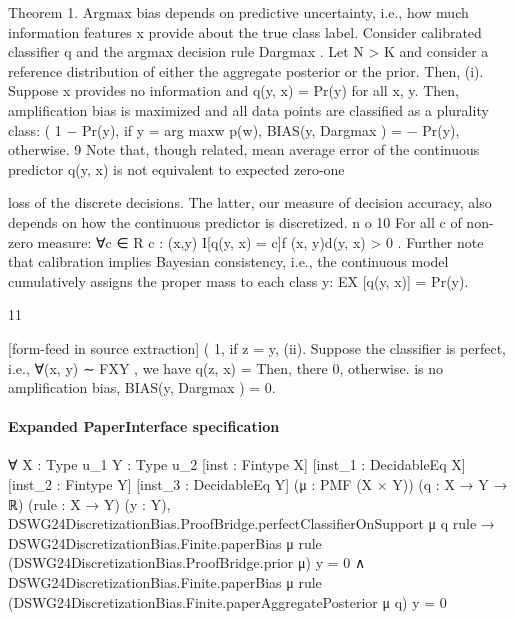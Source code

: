\documentclass[10pt]{article}
\begin{document}
\begin{ReviewVerbatim}

Theorem 1. Argmax bias depends on predictive uncertainty, i.e., how much information features x provide
about the true class label. Consider calibrated classifier q and the argmax decision rule Dargmax . Let N > K
and consider a reference distribution of either the aggregate posterior or the prior. Then,
  (i). Suppose x provides no information and q(y, x) = Pr(y) for all x, y. Then, amplification bias is
       maximized and all data points are classified as a plurality class:
                                                  (
                                                    1 − Pr(y), if y = arg maxw p(w),
                            BIAS(y, Dargmax ) =
                                                    − Pr(y),      otherwise.
   9 Note that, though related, mean average error of the continuous predictor q(y, x) is not equivalent to expected zero-one

loss of the discrete decisions. The latter, our measure of decision accuracy, also depends on how the continuous predictor is
discretized.                                n                                           o
  10 For all c of non-zero measure: ∀c ∈
                                                 R
                                             c : (x,y) I[q(y, x) = c]f (x, y)d(y, x) > 0 . Further note that calibration implies
Bayesian consistency, i.e., the continuous model cumulatively assigns the proper mass to each class y: EX [q(y, x)] = Pr(y).


                                                              11

[form-feed in source extraction]
                                                                                   (
                                                                                    1,                                                                        if z = y,
  (ii). Suppose the classifier is perfect, i.e., ∀(x, y) ∼ FXY , we have q(z, x) =                                                                                       Then, there
                                                                                    0,                                                                        otherwise.
        is no amplification bias, BIAS(y, Dargmax ) = 0.
\end{ReviewVerbatim}


\paragraph{Expanded PaperInterface specification}
\begin{ReviewVerbatim}
∀ {X : Type u_1} {Y : Type u_2} [inst : Fintype X] [inst_1 : DecidableEq X] [inst_2 : Fintype Y]
  [inst_3 : DecidableEq Y] (μ : PMF (X × Y)) (q : X → Y → ℝ) (rule : X → Y) (y : Y),
  DSWG24DiscretizationBias.ProofBridge.perfectClassifierOnSupport μ q rule →
    DSWG24DiscretizationBias.Finite.paperBias μ rule (DSWG24DiscretizationBias.ProofBridge.prior μ) y = 0 ∧
      DSWG24DiscretizationBias.Finite.paperBias μ rule (DSWG24DiscretizationBias.Finite.paperAggregatePosterior μ q) y =
        0
\end{ReviewVerbatim}
\end{document}
